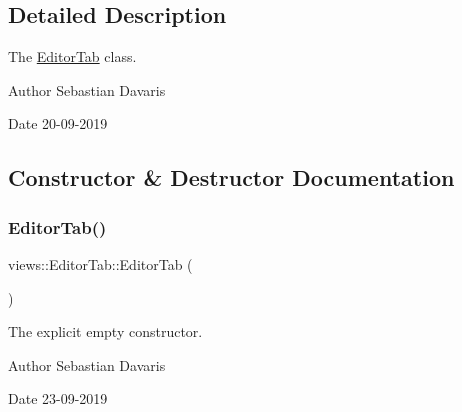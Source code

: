 \subsection{Detailed Description}
The \hyperlink{classviews_1_1_editor_tab}{Editor\+Tab} class. \begin{DoxyAuthor}{Author}
Sebastian Davaris 
\end{DoxyAuthor}
\begin{DoxyDate}{Date}
20-\/09-\/2019 
\end{DoxyDate}


\subsection{Constructor \& Destructor Documentation}
\mbox{\label{classviews_1_1_editor_tab_a17ae375bc6f448b049aef6bbb4b61bf2}} 
\subsubsection{\texorpdfstring{Editor\+Tab()}{EditorTab()}\hspace{0.1cm}{\footnotesize\ttfamily [1/2]}}
{\footnotesize\ttfamily views\+::\+Editor\+Tab\+::\+Editor\+Tab (\begin{DoxyParamCaption}{ }\end{DoxyParamCaption})\hspace{0.3cm}{\ttfamily [explicit]}}

The explicit empty constructor. \begin{DoxyAuthor}{Author}
Sebastian Davaris 
\end{DoxyAuthor}
\begin{DoxyDate}{Date}
23-\/09-\/2019 
\end{DoxyDate}
\mbox{\label{classviews_1_1_editor_tab_a63d17a88c1f547897ef4c88a983d47d3}} 
